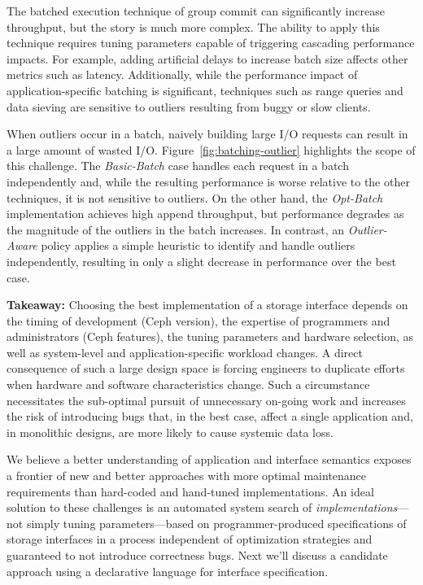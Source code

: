 The batched execution technique of group commit can significantly increase
throughput, but the story is much more complex. The ability to apply this
technique requires tuning parameters capable of triggering cascading performance impacts.
For example, adding artificial delays to increase batch size affects other metrics such as latency.
Additionally, while the performance impact of application-specific batching is significant,
techniques such as range queries and data sieving are sensitive to outliers
resulting from buggy or slow clients.

When outliers occur in a batch, naively building large I/O requests can result
in a large amount of wasted I/O. Figure~\ref{fig:batching-outlier} highlights
the scope of this challenge. The \emph{Basic-Batch} case handles each request
in a batch independently and, while the resulting performance is worse relative to the
other techniques, it is not sensitive to outliers. On the other hand, the \emph{Opt-Batch}
implementation achieves high append throughput, but performance degrades as
the magnitude of the outliers in the batch increases. In contrast, an
\emph{Outlier-Aware} policy applies a simple heuristic to identify and handle outliers 
independently, resulting in only a slight decrease in
performance over the best case.

\textbf{Takeaway:} Choosing the best implementation of a storage interface
depends on the timing of development (Ceph version), the expertise of
programmers and administrators (Ceph features), the tuning parameters and hardware
selection, as well as system-level and application-specific workload changes.
A direct consequence of such a large design space is forcing engineers
to duplicate efforts when hardware and software characteristics change. Such a 
circumstance necessitates the sub-optimal pursuit of unnecessary on-going work 
and increases the risk of introducing bugs that, in the best case, affect a single application and, in monolithic
designs, are more likely to cause systemic data loss.

We believe a better understanding of application and interface
semantics exposes a frontier of new and better approaches with more optimal maintenance requirements
than hard-coded and hand-tuned implementations. An ideal solution to these challenges is an automated system
search of \emph{implementations}---not simply tuning parameters---based on
programmer-produced specifications of storage interfaces in a process
independent of optimization strategies and guaranteed to not introduce
correctness bugs. Next we'll discuss a candidate approach using a declarative
language for interface specification.
